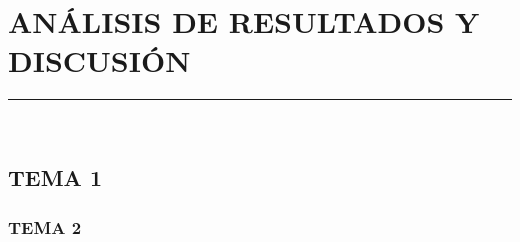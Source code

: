 \section{ANÁLISIS DE RESULTADOS Y DISCUSIÓN}
\rule{\textwidth}{1pt}\\
\lipsum[1]
\subsection{TEMA 1}
\lipsum[1]
\subsubsection{TEMA 2}
\lipsum[1]
\newpage